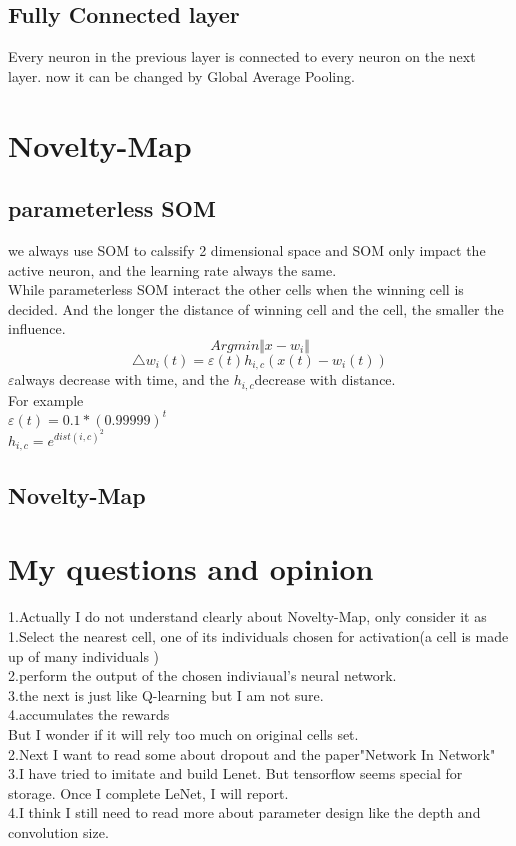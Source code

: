 \documentclass[12pt]{article}
\begin{document}
\subsection{Fully Connected layer}
Every neuron in the previous layer is connected to every neuron on the next layer.
now it can be changed by Global Average Pooling.
\section{Novelty-Map}
\subsection{parameterless SOM}
we always use SOM to calssify 2 dimensional space and SOM only impact the active neuron, and the learning rate always the same.\\ While parameterless SOM interact the other cells when the winning
cell is decided. And the longer the distance of winning cell and the cell, the smaller the influence.
$$Argmin\Vert{x-w_i}\Vert$$
$$\bigtriangleup{w_i}(t)=\varepsilon(t)h_{i,c}(x(t)-w_{i}(t))$$
$\varepsilon$always decrease with time, and the $h_{i,c}$decrease with distance.\\
For example  \\
$\varepsilon(t)=0.1*(0.99999)^t$\\
$h_{i,c}=e^{dist(i,c)^2}$
\subsection{Novelty-Map}

\section{My questions and opinion}
1.Actually I do not understand clearly about Novelty-Map, only consider it as \\
1.Select the nearest cell, one of its individuals chosen for activation(a cell is made up of many individuals )\\
2.perform the output of the chosen indiviaual's neural network.\\
3.the next is just like Q-learning but I am not sure.\\
4.accumulates the rewards\\
But I wonder if it will rely too much on original cells set.\\
2.Next I want to read some about dropout and the paper"Network In Network"\\
3.I have tried to imitate and build Lenet. But tensorflow seems special for storage. Once I complete LeNet, I will report.\\
4.I think I still need to read more about parameter design like the depth and convolution size. 
\end{document}
